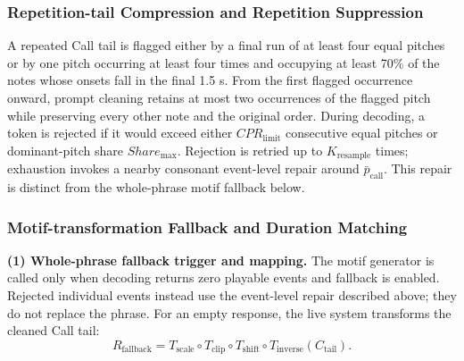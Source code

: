 \documentclass[11pt,a4paper]{article}
\begin{document}
\subsubsection{Repetition-tail Compression and Repetition Suppression}
\label{sec:repetition-tail-suppression}

A repeated Call tail is flagged either by a final run of at least four equal pitches or by one pitch occurring at least four times and occupying at least 70\% of the notes whose onsets fall in the final 1.5 s. From the first flagged occurrence onward, prompt cleaning retains at most two occurrences of the flagged pitch while preserving every other note and the original order. During decoding, a token is rejected if it would exceed either $CPR_{\mathrm{limit}}$ consecutive equal pitches or dominant-pitch share $Share_{\max}$. Rejection is retried up to $K_{\mathrm{resample}}$ times; exhaustion invokes a nearby consonant event-level repair around $\bar p_{\mathrm{call}}$. This repair is distinct from the whole-phrase motif fallback below.

\subsubsection{Motif-transformation Fallback and Duration Matching}
\label{sec:fallback-duration-matching}

\noindent\textbf{(1) Whole-phrase fallback trigger and mapping.}
The motif generator is called only when decoding returns zero playable events and fallback is enabled. Rejected individual events instead use the event-level repair described above; they do not replace the phrase. For an empty response, the live system transforms the cleaned Call tail:
\begin{equation}
R_{\mathrm{fallback}}
=
T_{\mathrm{scale}}
\circ T_{\mathrm{clip}}
\circ T_{\mathrm{shift}}
\circ T_{\mathrm{inverse}}
(C_{\mathrm{tail}}).
\label{eq:motif-fallback}
\end{equation}
\end{document}

